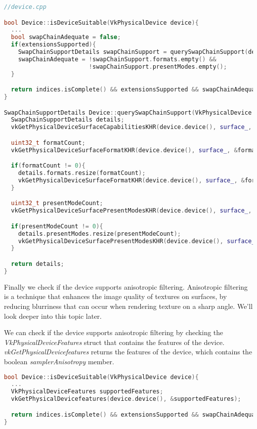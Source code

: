 \documentclass[12pt]{report} \usepackage{preamble}
\begin{document}
\begin{lstlisting}[language=C++]
//device.cpp

bool Device::isDeviceSuitable(VkPhysicalDevice device){
  ...
  bool swapChainAdequate = false;
  if(extensionsSupported){
    SwapChainSupportDetails swapChainSupport = querySwapChainSupport(device);
    swapChainAdequate = !swapChainSupport.formats.empty() &&
                        !swapChainSupport.presentModes.empty();
  }

  return indices.isComplete() && extensionsSupported && swapChainAdequate;
}

SwapChainSupportDetails Device::querySwapChainSupport(VkPhysicalDevice device){
  SwapChainSupportDetails details;
  vkGetPhysicalDeviceSurfaceCapabilitiesKHR(device.device(), surface_, &details.capabilities);

  uint32_t formatCount;
  vkGetPhysicalDeviceSurfaceFormatKHR(device.device(), surface_, &formatCount, nullptr);

  if(formatCount != 0){
    details.formats.resize(formatCount);
    vkGetPhysicalDeviceSurfaceFormatKHR(device.device(), surface_, &formatCount, details.formats.data());
  }

  uint32_t presentModeCount;
  vkGetPhysicalDeviceSurfacePresentModesKHR(device.device(), surface_, &presentModeCount, nullptr);

  if(presentModeCount != 0){
    details.presentModes.resize(presentModeCount);
    vkGetPhysicalDeviceSurfacePresentModesKHR(device.device(), surface_, &presentModeCount, details.presentModes.data());
  }

  return details;
}
\end{lstlisting}

Finally we check if the device supports anisotropic filtering. Anisotropic filtering is a technique
that enhances the image quality of textures on surfaces, by reducing blurriness that can occur when
rendering texture on a sharp angle. We'll look deeper into this topic later.

We can check if the device supports anisotropic filtering by checking the \textit{VkPhysicalDeviceFeatures}
struct that contains the features of the device. \textit{vkGetPhysicalDevicefeatures} returns the features
of the device, which contains the boolean \textit{samplerAnisotropy} member.

\begin{lstlisting}[language=C++]
bool Device::isDeviceSuitable(VkPhysicalDevice device){
  ...
  VkPhysicalDeviceFeatures supportedFeatures;
  vkGetPhysicalDevicefeatures(device.device(), &supportedFeatures);

  return indices.isComplete() && extensionsSupported && swapChainAdequate && supportedFeatures.samplerAnisotropy;
}
\end{lstlisting}
\end{document}
